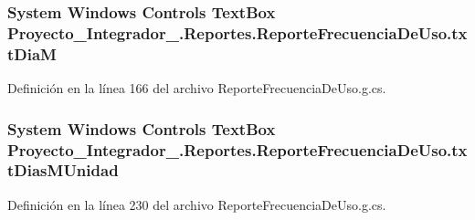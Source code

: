 \hypertarget{class_proyecto___integrador__3_1_1_reportes_1_1_reporte_frecuencia_de_uso_af8bd143e56528392c10ffa7c3cd6d107}{
\subsubsection[{txt\-Dia\-M}]{\setlength{\rightskip}{0pt plus 5cm}System Windows Controls Text\-Box Proyecto\-\_\-\-Integrador\-\_.\-Reportes.\-Reporte\-Frecuencia\-De\-Uso.\-txt\-Dia\-M\hspace{0.3cm}{\ttfamily [package]}}}\label{class_proyecto___integrador__3_1_1_reportes_1_1_reporte_frecuencia_de_uso_af8bd143e56528392c10ffa7c3cd6d107}


Definición en la línea 166 del archivo Reporte\-Frecuencia\-De\-Uso.\-g.\-cs.

\hypertarget{class_proyecto___integrador__3_1_1_reportes_1_1_reporte_frecuencia_de_uso_ac57af5c45eb5829244bdb033e19a7ea8}{
\subsubsection[{txt\-Dias\-M\-Unidad}]{\setlength{\rightskip}{0pt plus 5cm}System Windows Controls Text\-Box Proyecto\-\_\-\-Integrador\-\_.\-Reportes.\-Reporte\-Frecuencia\-De\-Uso.\-txt\-Dias\-M\-Unidad\hspace{0.3cm}{\ttfamily [package]}}}\label{class_proyecto___integrador__3_1_1_reportes_1_1_reporte_frecuencia_de_uso_ac57af5c45eb5829244bdb033e19a7ea8}


Definición en la línea 230 del archivo Reporte\-Frecuencia\-De\-Uso.\-g.\-cs.

